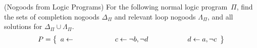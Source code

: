 \begin{Uebung}{(Nogoods from Logic Programs)}
For the following normal logic program~$\Pi$,
find the sets of completion nogoods $\Delta_\Pi$ and
relevant loop nogoods $\Lambda_\Pi$,
and all solutions for $\Delta_\Pi\cup\Lambda_\Pi$.
\[
\Pi =
\left\{
\begin{array}{r@{}c@{}l@{\hspace{20mm}}r@{}c@{}l@{\hspace{19.7mm}}r@{}c@{}l}
a & {} \leftarrow {} & &
c & {} \leftarrow {} & \naf b, \naf d &
d & {} \leftarrow {} & a, \naf c
\end{array}
\right\}
\]
\end{Uebung}

